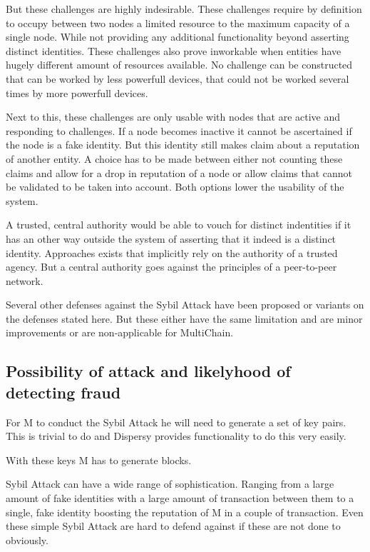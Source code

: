 But these challenges are highly indesirable.
These challenges require by definition to occupy between two nodes a limited resource to the maximum capacity of a single node.
While not providing any additional functionality beyond asserting distinct identities.
These challenges also prove inworkable when entities have hugely different amount of resources available.
No challenge can be constructed that can be worked by less powerfull devices,
that could not be worked several times by more powerfull devices.

Next to this, these challenges are only usable with nodes that are active and responding to challenges.
If a node becomes inactive it cannot be ascertained if the node is a fake identity.
But this identity still makes claim about a reputation of another entity.
A choice has to be made between either not counting these claims and allow for a drop in reputation of a node or
allow claims that cannot be validated to be taken into account.
Both options lower the usability of the system.

A trusted, central authority would be able to vouch for distinct indentities
if it has an other way outside the system of asserting that it indeed is a distinct identity.
Approaches exists that implicitly rely on the authority of a trusted agency.
But a central authority goes against the principles of a peer-to-peer network.

Several other defenses against the Sybil Attack have been proposed\cite{newsome-sybil}\cite{dinger-sybil}
or variants on the defenses stated here\cite{levine-sybilsurvey}.
But these either have the same limitation and are minor improvements or are non-applicable for MultiChain.

\subsection{Possibility of attack and likelyhood of detecting fraud}
For M to conduct the Sybil Attack he will need to generate a set of key pairs.
This is trivial to do and Dispersy provides functionality to do this very easily.


With these keys M has to generate blocks.


Sybil Attack can have a wide range of sophistication.
Ranging from a large amount of fake identities with a large amount of transaction between them
to a single, fake identity boosting the reputation of M in a couple of transaction.
Even these simple Sybil Attack are hard to defend against if these are not done to obviously.